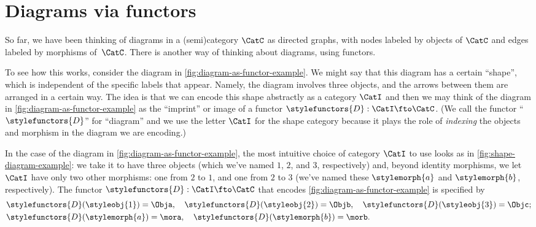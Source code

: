 
\section{Diagrams via functors}


So far, we have been thinking of diagrams in a (semi)category $\CatC$ as directed graphs, with nodes labeled by objects of $\CatC$ and edges labeled by morphisms of~$\CatC$.
There is another way of thinking about diagrams, using functors.

To see how this works, consider the diagram in \cref{fig:diagram-as-functor-example}.
We might say that this diagram has a certain ``shape'', which is independent of the specific labels that appear.
Namely, the diagram involves three objects, and the arrows between them are arranged in a certain way.
The idea is that we can encode this shape abstractly as a category $\CatI$ and then we may think of the diagram in \cref{fig:diagram-as-functor-example} as the ``imprint'' or image of a functor $\stylefunctors{D}: \CatI \fto \CatC$.
(We call the functor ``$\stylefunctors{D}$'' for ``diagram'' and we use the letter $\CatI$ for the shape category because it plays the role of \emph{indexing} the objects and morphism in the diagram we are encoding.)

\begin{marginfigure}
    \centering
    \caption{}
    \label{fig:diagram-as-functor-example}
\end{marginfigure}

\begin{marginfigure}
    \centering
    \caption{}
    \label{fig:shape-diagram-example}
\end{marginfigure}

In the case of the diagram in \cref{fig:diagram-as-functor-example}, the most intuitive choice of category $\CatI$ to use looks as in \cref{fig:shape-diagram-example}: we take it to have three objects (which we've named $1$, $2$, and $3$, respectively) and, beyond identity morphisms, we let $\CatI$ have only two other morphisms: one from $2$ to $1$, and one from $2$ to $3$ (we've named these $\stylemorph{a}$ and $\stylemorph{b}$, respectively).
The functor $\stylefunctors{D}: \CatI \fto \CatC$ that encodes \cref{fig:diagram-as-functor-example} is specified by
\begin{align*}
     & \stylefunctors{D}(\styleobj{1}) = \Obja, \quad \stylefunctors{D}(\styleobj{2}) = \Objb, \quad  \stylefunctors{D}(\styleobj{3}) = \Objc; \\
     & \stylefunctors{D}(\stylemorph{a}) = \mora, \quad \stylefunctors{D}(\stylemorph{b}) = \morb.
\end{align*}

